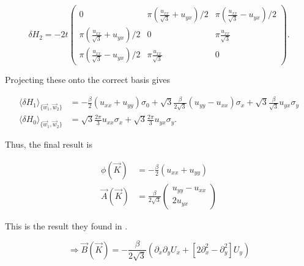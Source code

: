 \documentclass[../../../main.tex]{subfiles}
\begin{document}
\begin{equation}
	\delta H_2 = -2t
	\begin{pmatrix}
		0 & \pi(\frac{u_{xx}}{\sqrt{3}} + u_{yx})/2 & \pi(\frac{u_{xx}}{\sqrt{3}} - u_{yx} )/2 \\
		\pi(\frac{u_{xx}}{\sqrt{3}} + u_{yx})/2 & 0 & \pi \frac{u_{xx}}{\sqrt{3}} \\
		\pi(\frac{u_{xx}}{\sqrt{3}} - u_{yx} )/2 & \pi \frac{u_{xx}}{\sqrt{3}} & 0 
	\end{pmatrix}.
\end{equation}

Projecting these onto the correct basis gives 

\begin{align}
	\langle \delta H_1 \rangle_{\{\vec{w}_1, \vec{w}_2\}} &= -\frac{\beta}{2}(u_{xx} + u_{yy})\sigma_0 + \sqrt{3}\frac{\beta}{2\sqrt{3}}(u_{yy}-u_{xx}) \sigma_x + \sqrt{3} \frac{\beta}{\sqrt{3}}u_{yx} \sigma_y \\
	\langle \delta H_0 \rangle_{\{\vec{w}_1, \vec{w}_2\}} &= \sqrt{3}\frac{2\pi}{3}u_{xx}\sigma_x + \sqrt{3}\frac{2\pi}{3}u_{yx}\sigma_y.
\end{align}

Thus, the final result is 

\begin{align}
	\phi(\vec{K}) &= -\frac{\beta}{2}(u_{xx} + u_{yy}) \\
	\vec{A}(\vec{K}) &= \frac{\beta}{2\sqrt{3}}
	\begin{pmatrix}
		u_{yy}-u_{xx} \\
		2u_{yx}
	\end{pmatrix}
\end{align}

This is the result they found in \cite{Liu2020}.

\begin{equation}
	\Rightarrow \vec{B}(\vec{K}) = - \frac{\beta}{2\sqrt{3}}(\partial_x\partial_y U_x + [2\partial_x^2 - \partial_y^2] U_y)
\end{equation}
\end{document}
